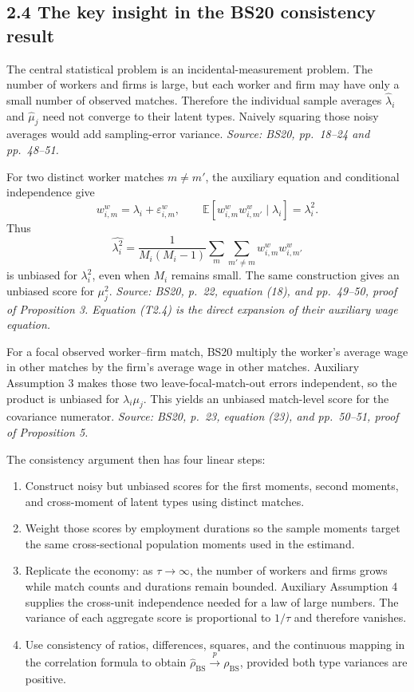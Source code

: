 \documentclass[11pt]{article}
\begin{document}
\subsection{2.4 The key insight in the BS20 consistency result}

The central statistical problem is an incidental-measurement problem.  The
number of workers and firms is large, but each worker and firm may have only a
small number of observed matches.  Therefore the individual sample averages
\(\widehat\lambda_i\) and \(\widehat\mu_j\) need not converge to their latent
types.  Naively squaring those noisy averages would add sampling-error
variance.  \textit{Source: BS20, pp.\ 18--24 and pp.\ 48--51.}

For two distinct worker matches \(m\ne m'\), the auxiliary equation and
conditional independence give
\[
w^w_{i,m}=\lambda_i+\varepsilon^w_{i,m},
\qquad
\mathbb E[
w^w_{i,m}w^w_{i,m'}\mid\lambda_i]
=\lambda_i^2.
\tag{T2.4}
\]
Thus
\[
\widehat{\lambda_i^2}
=
\frac{1}{M_i(M_i-1)}
\sum_m\sum_{m'\ne m}
w^w_{i,m}w^w_{i,m'}
\tag{T2.5}
\]
is unbiased for \(\lambda_i^2\), even when \(M_i\) remains small.  The same
construction gives an unbiased score for \(\mu_j^2\).
\textit{Source: BS20, p.\ 22, equation (18), and pp.\ 49--50, proof of
Proposition 3.  Equation (T2.4) is the direct expansion of their auxiliary
wage equation.}

For a focal observed worker--firm match, BS20 multiply the worker's average
wage in other matches by the firm's average wage in other matches.  Auxiliary
Assumption 3 makes those two leave-focal-match-out errors independent, so the
product is unbiased for \(\lambda_i\mu_j\).  This yields an unbiased match-level
score for the covariance numerator.
\textit{Source: BS20, p.\ 23, equation (23), and pp.\ 50--51, proof of
Proposition 5.}

The consistency argument then has four linear steps:

\begin{enumerate}
\item Construct noisy but unbiased scores for the first moments, second
  moments, and cross-moment of latent types using distinct matches.
\item Weight those scores by employment durations so the sample moments target
  the same cross-sectional population moments used in the estimand.
\item Replicate the economy: as \(\tau\to\infty\), the number of workers and
  firms grows while match counts and durations remain bounded.  Auxiliary
  Assumption 4 supplies the cross-unit independence needed for a law of large
  numbers.  The variance of each aggregate score is proportional to
  \(1/\tau\) and therefore vanishes.
\item Use consistency of ratios, differences, squares, and the continuous
  mapping in the correlation formula to obtain
  \(\widehat\rho_{\mathrm{BS}}\overset{p}{\to}\rho_{\mathrm{BS}}\), provided
  both type variances are positive.
\end{enumerate}
\end{document}
